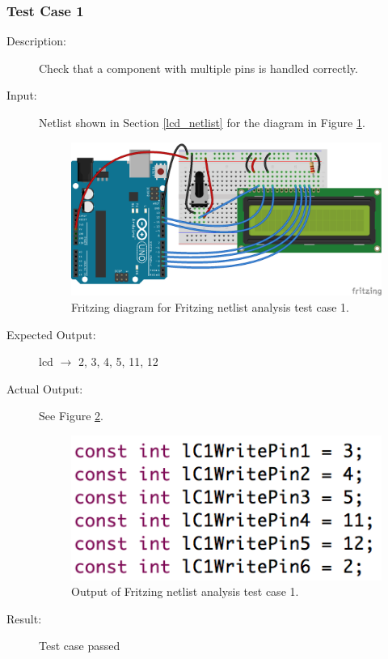 \documentclass{UoYCSproject}
\begin{document}
\subsubsection{Test Case 1}
\begin{description}
\item[Description:] Check that a component with multiple pins is handled correctly.
\item[Input:] Netlist shown in Section \ref{lcd_netlist} for the diagram in Figure \ref{fig:lcd_test}.
\begin{figure}[h!]
  \centering
  \includegraphics[width=0.5\linewidth]{graphics/LCD_test.png}
  \caption{Fritzing diagram for Fritzing netlist analysis test case 1.}
  \label{fig:lcd_test}
\end{figure}
\item[Expected Output:] lcd $\rightarrow$ 2, 3, 4, 5, 11, 12
\item[Actual Output:] See Figure \ref{fig:lcd_output}.
\begin{figure}[h!]
  \centering
  \includegraphics[width=0.4\linewidth]{graphics/lcd_test_output.png}
  \caption{Output of Fritzing netlist analysis test case 1.}
  \label{fig:lcd_output}
\end{figure}
\item[Result:] Test case passed
\end{description}
\end{document}
